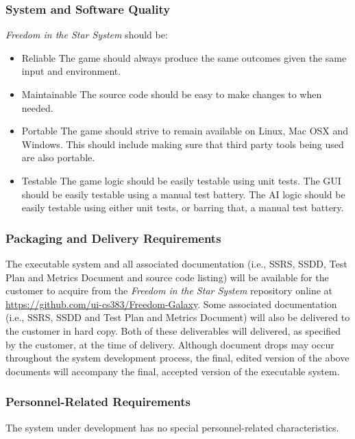 \documentclass[twoside,letterpaper]{article}
\begin{document}
\subsubsection{System and Software Quality}

\textit{Freedom in the Star System} should be:
\begin{itemize}
	\item Reliable
		\subitem The game should always produce the same outcomes given the same input and environment.
	\item Maintainable
		\subitem The source code should be easy to make changes to when needed.
	\item Portable
		\subitem The game should strive to remain available on Linux, Mac OSX and Windows.  This should include making sure that third party tools being used are also portable.
	\item Testable
		\subitem The game logic should be easily testable using unit tests.
		\subitem The GUI should be easily testable using a manual test battery.
		\subitem The AI logic should be easily testable using either unit tests, or barring that, a manual test battery.
\end{itemize}

\subsubsection{Packaging and Delivery Requirements}

The executable system and all associated documentation (i.e., SSRS, SSDD, Test Plan and Metrics Document and source code listing) will be available for the customer to acquire from the \textit{Freedom in the Star System} repository online at \url{https://github.com/ui-cs383/Freedom-Galaxy}.  Some associated documentation (i.e., SSRS, SSDD and Test Plan and Metrics Document) will also be delivered to the customer in hard copy.  Both of these deliverables will delivered, as specified by the customer, at the time of delivery.  Although document drops may occur throughout the system development process, the final, edited version of the above documents will accompany the final, accepted version of the executable system.

\subsubsection{Personnel-Related Requirements}
The system under development has no special personnel-related
characteristics.
\end{document}
